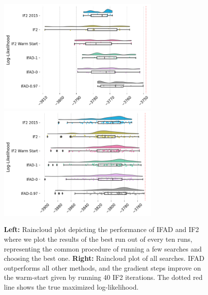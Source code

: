 \documentclass[11pt]{article}
\newcommand\arxiv[2]{#1} %
\begin{document}
\begin{figure}[ht]
    \includegraphics[width=\arxiv{8cm}{\textwidth/\real{4.2}}]{../imgs/095/boxplot.png}
    \includegraphics[width=\arxiv{8cm}{\textwidth/\real{4.2}}]{../imgs/095/boxplot_all.png}
    \caption{\textbf{Left:} Raincloud plot depicting the performance of IFAD and IF2 where we plot the results of the best run out of every ten runs, representing the common procedure of running a few searches and choosing the best one. \textbf{Right:} Raincloud plot of all searches. IFAD outperforms all other methods, and the gradient steps improve on the warm-start given by running 40 IF2 iterations.
    The dotted red line shows the true maximized log-likelihood.}
    \label{fig:boxplot}
\end{figure}
\end{document}

